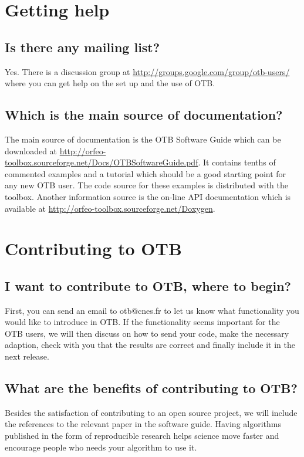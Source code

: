 \section{Getting help}
\subsection{Is there any mailing list?}
Yes. There is a discussion group at
\url{http://groups.google.com/group/otb-users/} where you can get help
on the set up and the use of OTB.

\subsection{Which is the main source of documentation?}
The main source of documentation is the OTB Software Guide which can
be downloaded at
\url{http://orfeo-toolbox.sourceforge.net/Docs/OTBSoftwareGuide.pdf}. It
contains tenths of commented examples and a tutorial which should be a good starting
point for any new OTB user. The code source for these examples is
distributed with the toolbox. Another information source is the
on-line API documentation which is available at \url{http://orfeo-toolbox.sourceforge.net/Doxygen}.

\section{Contributing to OTB}

\subsection{I want to contribute to OTB, where to begin?}

First, you can send an email to otb@cnes.fr to let us know what functionality 
you would like to introduce in OTB. If the functionality seems important for the 
OTB users, we will then discuss on how to send your code,
make the necessary adaption, check with you that the results are correct and finally
include it in the next release.

\subsection{What are the benefits of contributing to OTB?}

Besides the satisfaction of contributing to an open source project, we will include
the references to the relevant paper in the software guide. Having algorithms
published in the form of reproducible research helps science move faster and 
encourage people who needs your algorithm to use it.

